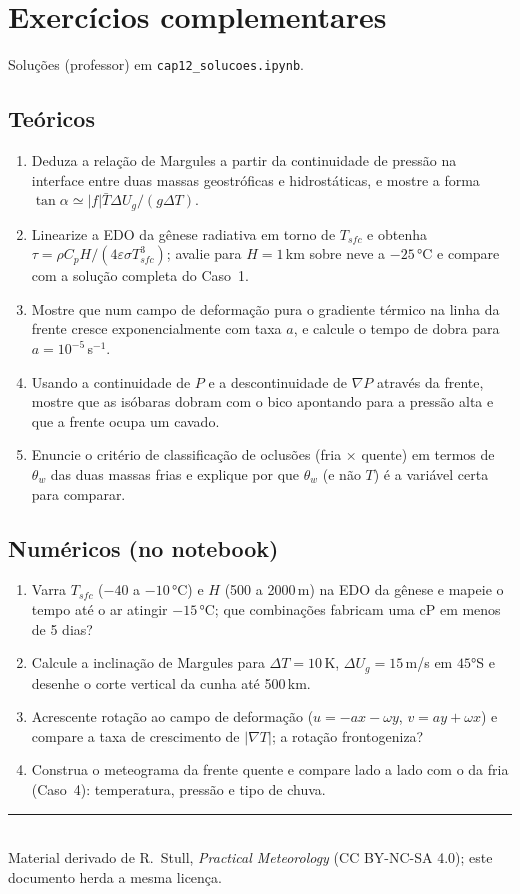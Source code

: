 \documentclass[11pt]{article}
\begin{document}
\section{Exercícios complementares}\label{sec:exercicios}

Soluções (professor) em \texttt{cap12\_solucoes.ipynb}.

\subsection*{Teóricos}

\begin{enumerate}[label=\textbf{T\arabic*.},itemsep=4pt]
  \item Deduza a relação de Margules a partir da continuidade de
        pressão na interface entre duas massas geostróficas e
        hidrostáticas, e mostre a forma
        $\tan\alpha \simeq |f|\bar T\Delta U_g/(g\Delta T)$.
  \item Linearize a EDO da gênese radiativa em torno de $T_{sfc}$ e
        obtenha $\tau = \rho C_p H/(4\varepsilon\sigma T_{sfc}^3)$;
        avalie para $H = 1$\,km sobre neve a $-25\,°$C e compare com a
        solução completa do Caso~1.
  \item Mostre que num campo de deformação pura o gradiente térmico na
        linha da frente cresce exponencialmente com taxa $a$, e calcule
        o tempo de dobra para $a = 10^{-5}$\,s$^{-1}$.
  \item Usando a continuidade de $P$ e a descontinuidade de $\nabla P$
        através da frente, mostre que as isóbaras dobram com o bico
        apontando para a pressão alta e que a frente ocupa um cavado.
  \item Enuncie o critério de classificação de oclusões (fria × quente)
        em termos de $\theta_w$ das duas massas frias e explique por
        que $\theta_w$ (e não $T$) é a variável certa para comparar.
\end{enumerate}

\subsection*{Numéricos (no notebook)}

\begin{enumerate}[label=\textbf{N\arabic*.},itemsep=4pt]
  \item Varra $T_{sfc}$ ($-40$ a $-10\,°$C) e $H$ (500 a 2000\,m) na
        EDO da gênese e mapeie o tempo até o ar atingir $-15\,°$C; que
        combinações fabricam uma cP em menos de 5 dias?
  \item Calcule a inclinação de Margules para $\Delta T = 10$\,K,
        $\Delta U_g = 15$\,m/s em $45°$S e desenhe o corte vertical da
        cunha até 500\,km.
  \item Acrescente rotação ao campo de deformação
        ($u = -ax-\omega y$, $v = ay+\omega x$) e compare a taxa de
        crescimento de $|\nabla T|$; a rotação frontogeniza?
  \item Construa o meteograma da frente quente e compare lado a lado
        com o da fria (Caso~4): temperatura, pressão e tipo de chuva.
\end{enumerate}

\vspace{1em}
\noindent\rule{\linewidth}{0.4pt}\\
{\scriptsize Material derivado de R.~Stull, \emph{Practical Meteorology}
(CC BY-NC-SA 4.0); este documento herda a mesma licença.}
\end{document}
